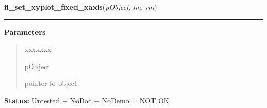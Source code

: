     \label{xformslib:library:fl_set_xyplot_fixed_xaxis}

    \vspace{0.5ex}

\hspace{.8\funcindent}\begin{boxedminipage}{\funcwidth}

    \raggedright \textbf{fl\_set\_xyplot\_fixed\_xaxis}(\textit{pObject}, \textit{lm}, \textit{rm})

    \vspace{-1.5ex}

    \rule{\textwidth}{0.5\fboxrule}
\setlength{\parskip}{2ex}
\setlength{\parskip}{1ex}
      \textbf{Parameters}
      \vspace{-1ex}

      \begin{quote}
        \begin{Ventry}{xxxxxxx}

          \item[pObject]

          pointer to object

        \end{Ventry}

      \end{quote}

\textbf{Status:} Untested + NoDoc + NoDemo = NOT OK



    \end{boxedminipage}

    \label{xformslib:library:fl_set_xyplot_fixed_yaxis}

    \vspace{0.5ex}


